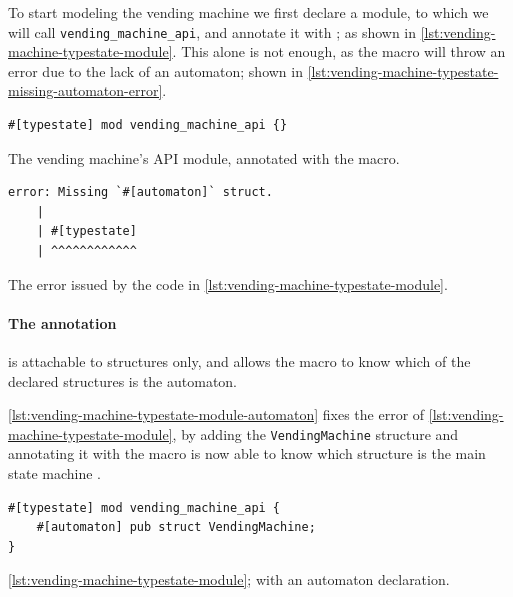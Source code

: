 To start modeling the vending machine we first declare a module, to which we will call \texttt{vending\_machine\_api},
and annotate it with ; as shown in \autoref{lst:vending-machine-typestate-module}.
This alone is not enough, as the macro will throw an error due to the lack of an automaton; shown in \autoref{lst:vending-machine-typestate-missing-automaton-error}.

\begin{listing}
    \begin{verbatim}
#[typestate] mod vending_machine_api {}
    \end{verbatim}
    \caption{The vending machine's \gls{API} module, annotated with the  macro.}
    \label{lst:vending-machine-typestate-module}
\end{listing}

\begin{listing}
    \begin{verbatim}
error: Missing `#[automaton]` struct.
    |
    | #[typestate]
    | ^^^^^^^^^^^^
    \end{verbatim}
    \caption{The error issued by the code in \autoref{lst:vending-machine-typestate-module}.}
    \label{lst:vending-machine-typestate-missing-automaton-error}
\end{listing}

\paragraph{The  annotation} is attachable to structures only, %
and allows the macro to know which of the declared structures is the automaton.

\autoref{lst:vending-machine-typestate-module-automaton} fixes the error of \autoref{lst:vending-machine-typestate-module},
by adding the \texttt{VendingMachine} structure and annotating it with 
the macro is now able to know which structure is the main state machine .

\begin{listing}
    \begin{verbatim}
#[typestate] mod vending_machine_api {
    #[automaton] pub struct VendingMachine;
}
    \end{verbatim}
    \caption{\autoref{lst:vending-machine-typestate-module}; with an automaton declaration.}
    \label{lst:vending-machine-typestate-module-automaton}
\end{listing}

